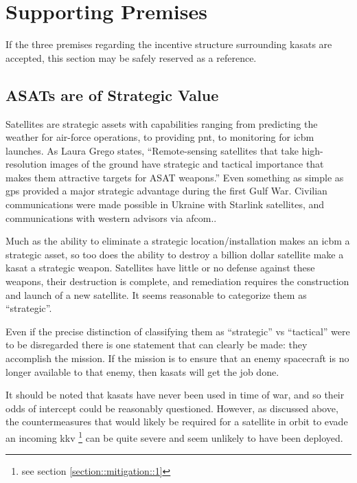\section{Supporting Premises}
\label{section::support}

If the three premises regarding the incentive structure surrounding
\acp{kasat} are accepted, this section may be safely reserved as a
reference.

\subsection{ASATs are of Strategic Value}

Satellites are strategic assets with capabilities ranging from
predicting the weather for air-force operations, to providing
\ac{pnt}, to monitoring for \ac{icbm} launches.  As Laura Grego
states, ``Remote-sensing satellites that take high-resolution images
of the ground have strategic and tactical importance that makes them
attractive targets for ASAT weapons.''\cite[p16]{grego} Even something
as simple as \ac{gps} provided a major strategic advantage during the
first Gulf War.\cite{gps-gulf} Civilian communications were made
possible in Ukraine with Starlink satellites, and communications with
western advisors via \ac{afcom}.\cite{xxx}.

Much as the ability to eliminate a strategic location/installation
makes an \ac{icbm} a strategic asset, so too does the ability to
destroy a billion dollar satellite make a \ac{kasat} a strategic
weapon.  Satellites have little or no defense against these weapons,
their destruction is complete, and remediation requires the
construction and launch of a new satellite.  It seems reasonable to
categorize them as ``strategic''.

Even if the precise distinction of classifying them as ``strategic''
vs ``tactical'' were to be disregarded there is one statement that can
clearly be made: they accomplish the mission.  If the mission is to
ensure that an enemy spacecraft is no longer available to that enemy,
then \acp{kasat} will get the job done.

It should be noted that \acp{kasat} have never been used in time of
war\cite{brian}, and so their odds of intercept could be reasonably
questioned.  However, as discussed above, the countermeasures that
would likely be required for a satellite in orbit to evade an incoming
\ac{kkv} \footnote{see section \ref{section::mitigation::1}} can be
quite severe and seem unlikely to have been deployed.



